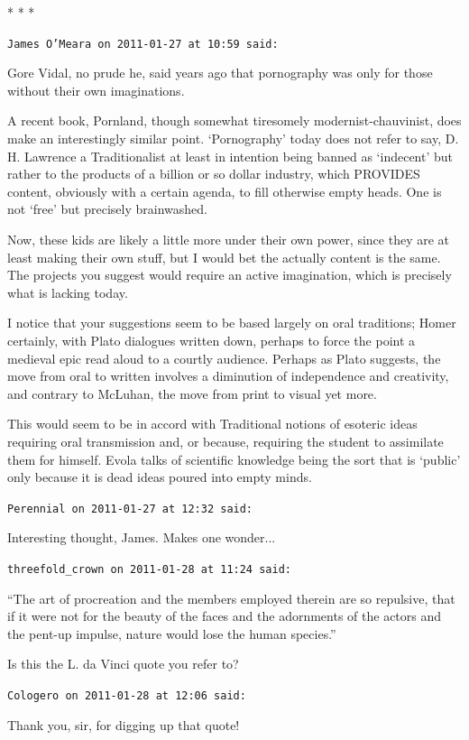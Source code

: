 \begin{center}* * *\end{center}

\begin{footnotesize}
\begin{sffamily}
\texttt{James O'Meara on 2011-01-27 at 10:59 said:}

Gore Vidal, no prude he, said years ago that pornography was only for those without their own imaginations.

A recent book, Pornland, though somewhat tiresomely modernist-chauvinist, does make an interestingly similar point. `Pornography' today does not refer to say, D. H. Lawrence a Traditionalist at least in intention being banned as `indecent' but rather to the products of a billion or so dollar industry, which PROVIDES content, obviously with a certain agenda, to fill otherwise empty heads. One is not `free' but precisely brainwashed.

Now, these kids are likely a little more under their own power, since they are at least making their own stuff, but I would bet the actually content is the same. The projects you suggest would require an active imagination, which is precisely what is lacking today.

I notice that your suggestions seem to be based largely on oral traditions; Homer certainly, with Plato dialogues written down, perhaps to force the point a medieval epic read aloud to a courtly audience. Perhaps as Plato suggests, the move from oral to written involves a diminution of independence and creativity, and contrary to McLuhan, the move from print to visual yet more.

This would seem to be in accord with Traditional notions of esoteric ideas requiring oral transmission and, or because, requiring the student to assimilate them for himself. Evola talks of scientific knowledge being the sort that is `public' only because it is dead ideas poured into empty minds.

\hfill

\texttt{Perennial on 2011-01-27 at 12:32 said:}

Interesting thought, James. Makes one wonder... 

\hfill

\texttt{threefold\_crown on 2011-01-28 at 11:24 said:}

``The art of procreation and the members employed therein are so repulsive, that if it were not for the beauty of the faces and the adornments of the actors and the pent-up impulse, nature would lose the human species.''

Is this the L. da Vinci quote you refer to?

\hfill

\texttt{Cologero on 2011-01-28 at 12:06 said:}

Thank you, sir, for digging up that quote!

\hfill

\end{sffamily}
\end{footnotesize}

